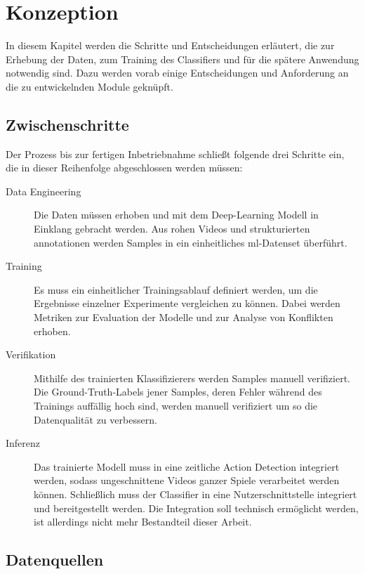 \chapter{Konzeption}
\label{ch:concept}

In diesem Kapitel werden die Schritte und Entscheidungen erläutert, die zur Erhebung der Daten, zum Training des Classifiers und für die spätere Anwendung notwendig sind.
Dazu werden vorab einige Entscheidungen und Anforderung an die zu entwickelnden Module geknüpft.

\section{Zwischenschritte}
\label{sec:steps}

Der Prozess bis zur fertigen Inbetriebnahme schließt folgende drei Schritte ein, die in dieser Reihenfolge abgeschlossen werden müssen:

\begin{description}
    \item[Data Engineering] Die Daten müssen erhoben und mit dem Deep-Learning Modell in Einklang gebracht werden.
    Aus rohen Videos und strukturierten \gls{annotationen} werden Samples in ein einheitliches \gls{ml}-Datenset überführt.
    \item[Training] Es muss ein einheitlicher Trainingsablauf definiert werden, um die Ergebnisse einzelner Experimente vergleichen zu können.
    Dabei werden Metriken zur Evaluation der Modelle und zur Analyse von Konflikten erhoben.
    \item[Verifikation] Mithilfe des trainierten Klassifizierers werden Samples manuell verifiziert.
    Die Ground-Truth-Labels jener Samples, deren Fehler während des Trainings auffällig hoch sind, werden manuell verifiziert um so die Datenqualität zu verbessern.
    \item[Inferenz] Das trainierte Modell muss in eine zeitliche Action Detection integriert werden, sodass ungeschnittene Videos ganzer Spiele verarbeitet werden können.
    Schließlich muss der Classifier in eine Nutzerschnittstelle integriert und bereitgestellt werden.
    Die Integration soll technisch ermöglicht werden, ist allerdings nicht mehr Bestandteil dieser Arbeit.
\end{description}

\section{Datenquellen}
\label{sec:datenquellen}

